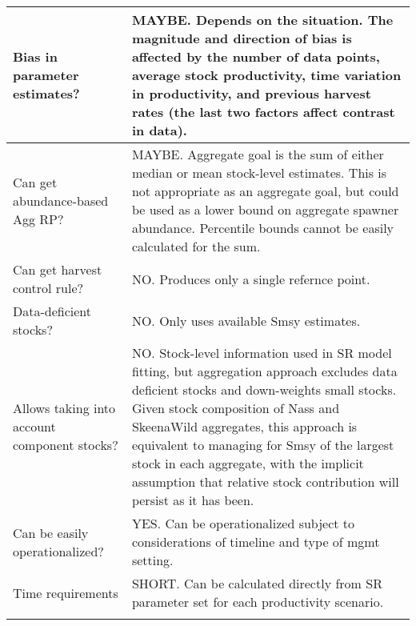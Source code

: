 \documentclass[french,11pt]{book}
\begin{document}
\begin{longtable}[t]{>{\raggedright\arraybackslash}p{9em}>{\raggedright\arraybackslash}p{37em}}
\midrule Bias in parameter estimates? & MAYBE.  Depends on the situation. The magnitude and direction of bias is affected by the number of data points, average stock productivity, time variation in productivity, and previous harvest rates (the last two factors affect contrast in data).\\
\midrule Can get abundance-based Agg RP? & MAYBE.  Aggregate goal is the sum of either median or mean stock-level estimates.  This is not appropriate as an aggregate goal, but could be used as a lower bound on aggregate spawner abundance. Percentile bounds cannot be easily calculated for the sum.\\
\midrule Can get harvest control rule? & NO.  Produces only a single refernce point.\\
\midrule Data-deficient stocks? & NO. Only uses available Smsy estimates.\\
\midrule Allows taking into account component stocks? & NO.  Stock-level information used in SR model fitting, but aggregation approach excludes data deficient stocks and down-weights small stocks. Given stock composition of Nass and SkeenaWild aggregates, this approach is equivalent to managing for Smsy of the largest stock in each aggregate, with the implicit assumption that relative stock contribution will persist as it has been.\\
\midrule Can be easily operationalized? & YES. Can be operationalized subject to considerations of timeline and type of mgmt setting.\\
\midrule Time requirements & SHORT. Can be calculated directly from SR parameter set for each productivity scenario.\\* \end{longtable}

\endgroup{} \endgroup{}

\clearpage
\end{document}
